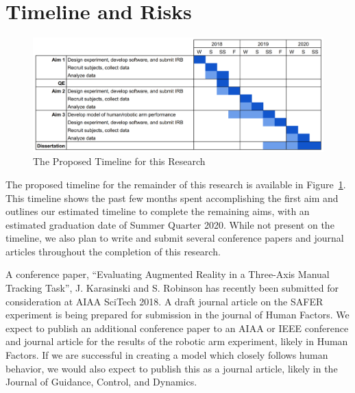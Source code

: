 \documentclass[float=false, crop=false]{standalone}
\begin{document}
\section{Timeline and Risks}
\begin{figure}[h!]
    \begin{center}
        \includegraphics[width=\linewidth]{./../img/image1.png}
        \caption{The Proposed Timeline for this Research}
        \label{timeline}
    \end{center}
\end{figure}

The proposed timeline for the remainder of this research is available in Figure~\ref{timeline}.
This timeline shows the past few months spent accomplishing the first aim and outlines our estimated timeline to complete the remaining aims, with an estimated graduation date of Summer Quarter 2020.
While not present on the timeline, we also plan to write and submit several conference papers and journal articles throughout the completion of this research.

A conference paper, ``Evaluating Augmented Reality in a Three-Axis Manual Tracking Task'', J. Karasinski and S. Robinson has recently been submitted for consideration at AIAA SciTech 2018.
A draft journal article on the SAFER experiment is being prepared for submission in the journal of Human Factors.
We expect to publish an additional conference paper to an AIAA or IEEE conference and journal article for the results of the robotic arm experiment, likely in Human Factors.
If we are successful in creating a model which closely follows human behavior, we would also expect to publish this as a journal article, likely in the Journal of Guidance, Control, and Dynamics.
\end{document}

